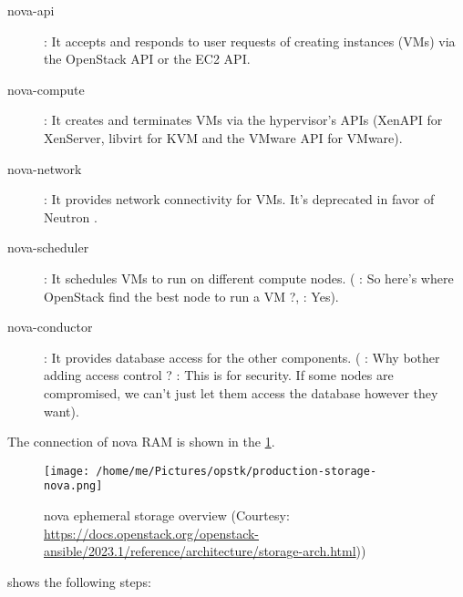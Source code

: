 \begin{description}
\item[nova-api] : It accepts and responds to user requests of creating instances
  (VMs) via the OpenStack API or the EC2 API.
\item[nova-compute] : It creates and terminates VMs via the hypervisor's APIs
  (XenAPI for XenServer, libvirt for KVM and the VMware API for VMware).
\item[nova-network] : It provides network connectivity for VMs. It's deprecated
  in favor of Neutron .
\item[nova-scheduler] : It schedules VMs to run on different compute nodes.
  ( : So here's where OpenStack find the best node to run a VM ?,
   : Yes).
\item[nova-conductor] : It provides database access for the other components.
  ( : Why bother adding access control ?  : This is
  for security. If some nodes are compromised, we can't just let them access the
  database however they want).
\end{description}




The connection of nova RAM is shown in the \cref{fig:production-storage-nova}.
\begin{figure}[h]
  \centering
  \texttt{[image: /home/me/Pictures/opstk/production-storage-nova.png]}
  \caption{nova ephemeral storage overview (Courtesy:
    \url{https://docs.openstack.org/openstack-ansible/2023.1/reference/architecture/storage-arch.html}))}
  \label{fig:production-storage-nova}
\end{figure}
\FloatBarrier

 shows the following steps:

